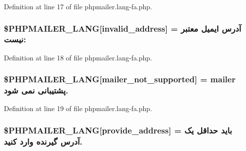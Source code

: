 Definition at line 17 of file phpmailer.\+lang-\/fa.\+php.

\subsubsection[{\texorpdfstring{\$\+P\+H\+P\+M\+A\+I\+L\+E\+R\+\_\+\+L\+A\+NG}{$PHPMAILER_LANG}}]{\setlength{\rightskip}{0pt plus 5cm}\$P\+H\+P\+M\+A\+I\+L\+E\+R\+\_\+\+L\+A\+NG\mbox{[}\textquotesingle{}invalid\+\_\+address\textquotesingle{}\mbox{]} = \textquotesingle{}آدرس ایمیل معتبر نیست\+: \textquotesingle{}}\hypertarget{phpmailer_8lang-fa_8php_a42d61bcea4c79599ecb44fd062f54d47}{}\label{phpmailer_8lang-fa_8php_a42d61bcea4c79599ecb44fd062f54d47}


Definition at line 18 of file phpmailer.\+lang-\/fa.\+php.

\subsubsection[{\texorpdfstring{\$\+P\+H\+P\+M\+A\+I\+L\+E\+R\+\_\+\+L\+A\+NG}{$PHPMAILER_LANG}}]{\setlength{\rightskip}{0pt plus 5cm}\$P\+H\+P\+M\+A\+I\+L\+E\+R\+\_\+\+L\+A\+NG\mbox{[}\textquotesingle{}mailer\+\_\+not\+\_\+supported\textquotesingle{}\mbox{]} = \textquotesingle{} mailer پشتیبانی نمی شود.\textquotesingle{}}\hypertarget{phpmailer_8lang-fa_8php_aa2ebcb8833ee83a7ad67401c4bb3a6ad}{}\label{phpmailer_8lang-fa_8php_aa2ebcb8833ee83a7ad67401c4bb3a6ad}


Definition at line 19 of file phpmailer.\+lang-\/fa.\+php.

\subsubsection[{\texorpdfstring{\$\+P\+H\+P\+M\+A\+I\+L\+E\+R\+\_\+\+L\+A\+NG}{$PHPMAILER_LANG}}]{\setlength{\rightskip}{0pt plus 5cm}\$P\+H\+P\+M\+A\+I\+L\+E\+R\+\_\+\+L\+A\+NG\mbox{[}\textquotesingle{}provide\+\_\+address\textquotesingle{}\mbox{]} = \textquotesingle{}باید حداقل یک آدرس گیرنده وارد کنید.\textquotesingle{}}\hypertarget{phpmailer_8lang-fa_8php_a8b97897c2406b7392b056f375feeefbb}{}\label{phpmailer_8lang-fa_8php_a8b97897c2406b7392b056f375feeefbb}


